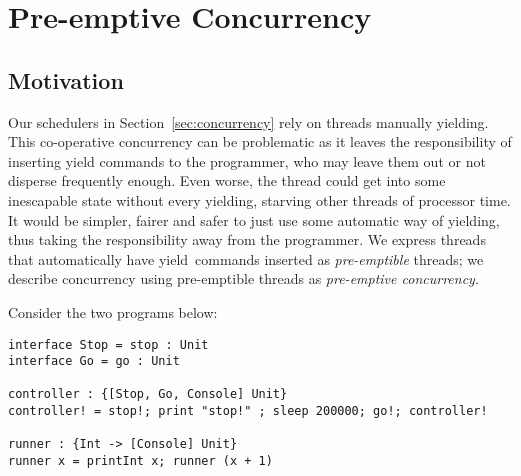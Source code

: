 \documentclass[msc,deptreport,cs]{infthesis} %
\newcommand\yield{\textsf{yield}\xspace}
\newcommand{\todo}[1]
           {{\par\noindent\small\color{RoyalPurple}
  \framebox{\parbox{\dimexpr\linewidth-2\fboxsep-2\fboxrule}
    {\textbf{TODO:} #1}}}}
\begin{document}
\chapter{Pre-emptive Concurrency}
\label{chap:preemptive-concurrency}

\section{Motivation}
\label{sec:interrupt-motivation}

Our schedulers in Section~\ref{sec:concurrency} rely on threads manually
\yield{}ing. This co-operative concurrency can be problematic as it leaves the
responsibility of inserting \yield{} commands to the programmer, who may leave
them out or not disperse frequently enough. Even worse, the thread could get
into some inescapable state without every \yield{}ing, starving other threads of
processor time. It would be simpler, fairer and safer to just use some automatic
way of \yield{}ing, thus taking the responsibility away from the programmer. We express threads that automatically have \yield~commands inserted as \emph{pre-emptible} threads; we describe concurrency using pre-emptible threads as \emph{pre-emptive concurrency}.




Consider the two programs below:

\begin{lstlisting}
interface Stop = stop : Unit
interface Go = go : Unit

controller : {[Stop, Go, Console] Unit}
controller! = stop!; print "stop!" ; sleep 200000; go!; controller!

runner : {Int -> [Console] Unit}
runner x = printInt x; runner (x + 1)
\end{lstlisting}
\end{document}
